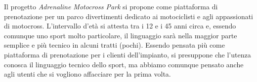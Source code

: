 Il progetto \textit{Adrenaline Motocross Park} si propone come piattaforma di prenotazione per un parco divertimenti dedicato ai motociclisti
e agli appassionati di motocross. L'intervallo d'età si attesta tra i 12 e i 45 anni circa e, essendo comunque uno sport molto particolare,
il linguaggio sarà nella maggior parte semplice e più tecnico in alcuni tratti (pochi). Essendo pensata più come piattaforma di prenotazione
per i clienti dell'impianto, si presuppone che l'utenza conosca il linguaggio tecnico dello sport, ma abbiamo comunque pensato anche agli
utenti che si vogliono affacciare per la prima volta.